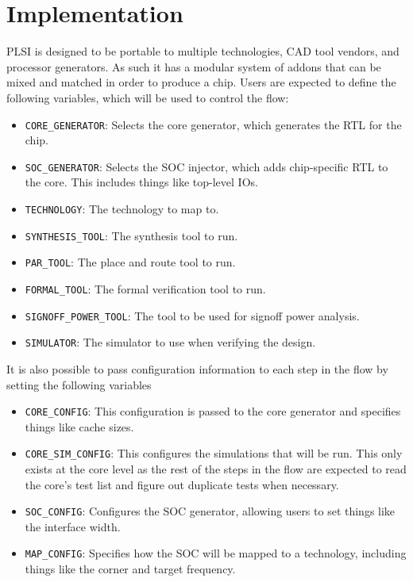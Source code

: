 \documentclass{article}
\begin{document}
\chapter{Implementation}

PLSI is designed to be portable to multiple technologies, CAD tool vendors, and
processor generators.  As such it has a modular system of addons that can be
mixed and matched in order to produce a chip.  Users are expected to define the
following variables, which will be used to control the flow:

\begin{itemize}
\item \texttt{CORE\_GENERATOR}: Selects the core generator, which generates the
RTL for the chip.
\item \texttt{SOC\_GENERATOR}: Selects the SOC injector, which adds
chip-specific RTL to the core.  This includes things like top-level IOs.
\item \texttt{TECHNOLOGY}: The technology to map to.
\item \texttt{SYNTHESIS\_TOOL}: The synthesis tool to run.
\item \texttt{PAR\_TOOL}: The place and route tool to run.
\item \texttt{FORMAL\_TOOL}: The formal verification tool to run.
\item \texttt{SIGNOFF\_POWER\_TOOL}: The tool to be used for signoff power analysis.
\item \texttt{SIMULATOR}: The simulator to use when verifying the design.
\end{itemize}

It is also possible to pass configuration information to each step in the flow
by setting the following variables

\begin{itemize}
\item \texttt{CORE\_CONFIG}: This configuration is passed to the core generator
and specifies things like cache sizes.
\item \texttt{CORE\_SIM\_CONFIG}: This configures the simulations that will be
run.  This only exists at the core level as the rest of the steps in the flow
are expected to read the core's test list and figure out duplicate tests when
necessary.
\item \texttt{SOC\_CONFIG}: Configures the SOC generator, allowing users to set
things like the interface width.
\item \texttt{MAP\_CONFIG}: Specifies how the SOC will be mapped to a
technology, including things like the corner and target frequency.
\end{itemize}
\end{document}

